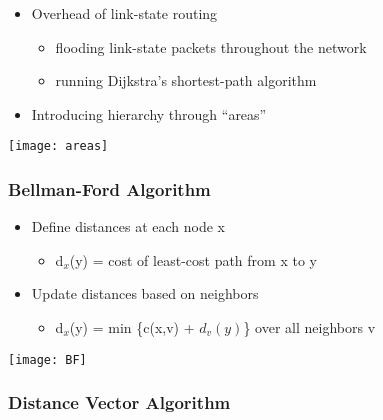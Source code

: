 \documentclass[../resumosRCOM.tex]{subfiles}
\begin{document}
\begin{itemize}
    \item Overhead of link-state routing
    \begin{itemize}
        \item flooding link-state packets throughout the network
        \item running Dijkstra’s shortest-path algorithm
    \end{itemize}
    \item Introducing hierarchy through “areas”
\end{itemize}

\begin{center}
    \texttt{[image: areas]}
\end{center}

\subsubsection{Bellman-Ford Algorithm}

\begin{itemize}
    \item Define distances at each node x
    \begin{itemize}
        \item d$_x$(y) = cost of least-cost path from x to y
    \end{itemize}
    \item Update distances based on neighbors
    \begin{itemize}
        \item d$_x$(y) = min \{c(x,v) + $d_v(y)$\} over all neighbors v
    \end{itemize}
\end{itemize}

\begin{center}
    \texttt{[image: BF]}
\end{center}

\subsubsection{Distance Vector Algorithm}
\end{document}
